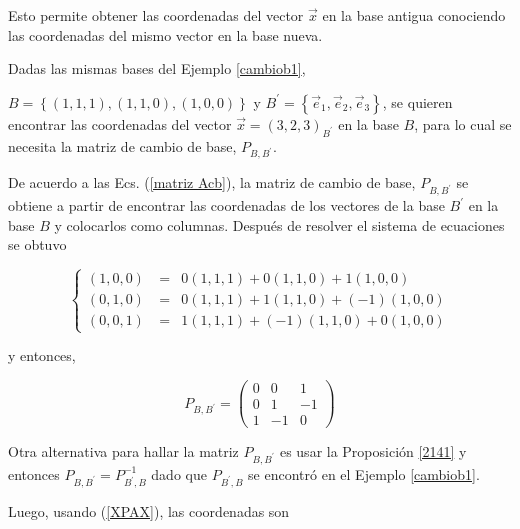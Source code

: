 Esto  permite obtener las coordenadas del vector $\vec{x}$ en la base antigua  conociendo las coordenadas del mismo vector en la  base nueva.




\begin{example}


Dadas las mismas  bases del Ejemplo \ref{cambiob1}, 

$B =\left\{(1,1,1), (1,1,0),(1,0,0)\right\}$ y $B^{\prime}= \left\{\vec{e}_1,\vec{e}_2, \vec{e}_3\right\}$, se quieren encontrar las coordenadas del vector $\vec{x}=(3,2,3)_{B^{\prime}}$ en la base $B$, para lo cual se necesita la matriz de cambio de base, $P_{B,B ^{\prime}}$.

De acuerdo a las Ecs. (\ref{matriz Acb}), la matriz de cambio de base, $P_{B,B ^{\prime}}$ se obtiene a partir de encontrar las coordenadas de  los vectores de la base $B^{\prime}$ en la base $B$  y colocarlos como columnas. Después de resolver el sistema de ecuaciones se obtuvo



\begin{equation} \label{ec5}
\left\{ \begin{array} {ccl} 
                   (1,0,0)&\ =&   0 (1,1,1)+0(1,1,0)+1(1,0,0)   \\
									(0,1,0)&\ =&   0 (1,1,1)+1(1,1,0)+(-1)(1,0,0)   \\
									(0,0,1)&\ =&   1 (1,1,1)+(-1)(1,1,0)+0(1,0,0)
                    \end{array}
           \right.
\end{equation}

\bigskip
\noindent
y entonces, 

\bigskip

$$P_{B,B ^{\prime}}=\left(\begin{array}{ccc} 0 & 0 &  1 \\ 0 & 1 & -1
\\ 1 & -1 & 0
\end{array}
 \right)$$
 
\bigskip

 Otra alternativa para hallar la matriz $P_{B,B ^{\prime}}$   es usar la Proposición \ref{2141} y entonces  $  P_{B,B ^{\prime}} = P_{B ^{\prime},B}^{-1}$ dado que $P_{B ^{\prime},B}$ se encontró en el Ejemplo \ref{cambiob1}.

\bigskip

Luego, usando (\ref{XPAX}), las coordenadas son


\end{example}
